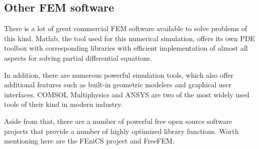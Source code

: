 \documentclass[parskip=half, titlepage=yes, 12pt, BCOR=12mm, DIV=calc]{scrartcl}
\begin{document}
\subsection{Other FEM software}

There is a lot of great commercial FEM software available to solve problems of this kind. Matlab, the tool used for this numerical simulation, offers its own PDE toolbox with corresponding libraries with efficient implementation of almost all aspects for solving partial differential equations.

In addition, there are numerous powerful simulation tools, which also offer additional features such as built-in geometric modelers and graphical user interfaces. COMSOL Multiphysics and ANSYS are two of the most widely used tools of their kind in modern industry.

Aside from that, there are a number of powerful free open source software projects that provide a number of highly optimized library functions. Worth mentioning here are the FEniCS project and FreeFEM.


\newpage


\clearpage
\nocite{*}
\printbibliography

\newpage


%  
\end{document}
